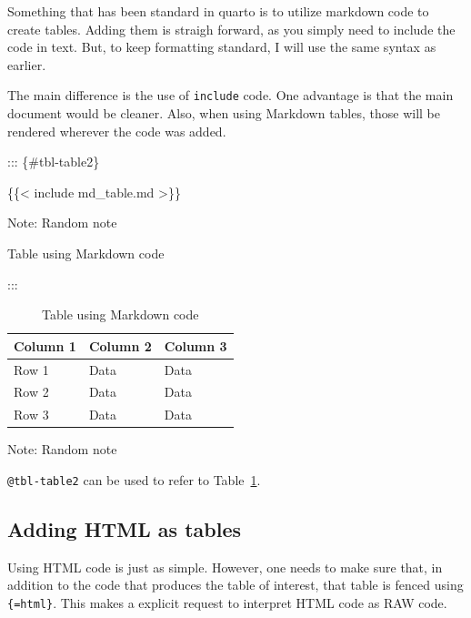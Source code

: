 \documentclass[
  11pts,
]{article}
\newenvironment{Shaded}{\begin{snugshade}}{\end{snugshade}}
\newcommand{\NormalTok}[1]{\textcolor[rgb]{0.00,0.23,0.31}{#1}}
\begin{document}
Something that has been standard in quarto is to utilize markdown code
to create tables. Adding them is straigh forward, as you simply need to
include the code in text. But, to keep formatting standard, I will use
the same syntax as earlier.

The main difference is the use of \texttt{include} code. One advantage
is that the main document would be cleaner. Also, when using Markdown
tables, those will be rendered wherever the code was added.

\begin{Shaded}
\begin{Highlighting}[]
\NormalTok{::: \{\#tbl{-}table2\}}

\NormalTok{\{\{\textless{} include md\_table.md \textgreater{}\}\}}

\NormalTok{Note: Random note}

\NormalTok{Table using Markdown code}

\NormalTok{:::}
\end{Highlighting}
\end{Shaded}

\begin{longtable}[]{@{}lll@{}}

\caption{\label{tbl-table2}Table using Markdown code}

\tabularnewline

\toprule\noalign{}
Column 1 & Column 2 & Column 3 \\
\midrule\noalign{}
\endhead
\bottomrule\noalign{}
\endlastfoot
Row 1 & Data & Data \\
Row 2 & Data & Data \\
Row 3 & Data & Data \\

\end{longtable}

Note: Random note

\texttt{@tbl-table2} can be used to refer to Table~\ref{tbl-table2}.

\subsection{Adding HTML as tables}\label{adding-html-as-tables}

Using HTML code is just as simple. However, one needs to make sure that,
in addition to the code that produces the table of interest, that table
is fenced using
\texttt{\textasciigrave{}\textasciigrave{}\textasciigrave{}\{=html\}}.
This makes a explicit request to interpret HTML code as RAW code.
\end{document}
